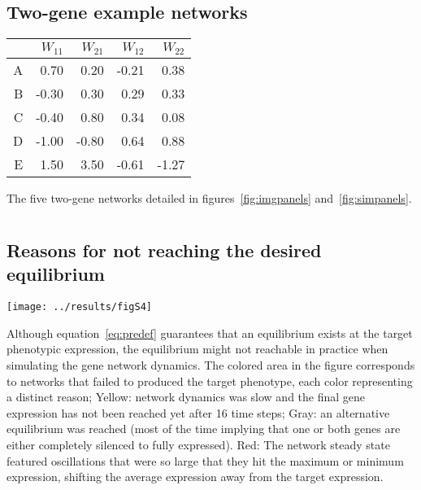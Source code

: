 \documentclass[10pt,a4paper]{article}
\begin{document}
\begin{appendices}
    \subsection*{Two-gene example networks}

	\begin{center}
	\begin{tabular}{rrrrr}
	  \hline
	 & $W_{11}$ & $W_{21}$ & $W_{12}$ & $W_{22}$ \\ 
	  \hline
	  A & 0.70 & 0.20 & -0.21 & 0.38 \\ 
	  B & -0.30 & 0.30 & 0.29 & 0.33 \\ 
	  C & -0.40 & 0.80 & 0.34 & 0.08 \\ 
	  D & -1.00 & -0.80 & 0.64 & 0.88 \\ 
	  E & 1.50 & 3.50 & -0.61 & -1.27 \\ 
	   \hline
	\end{tabular}
	\end{center}
	
	{\color{Gray} The five two-gene networks detailed in figures~\ref{fig:imgpanels} and~\ref{fig:simpanels}.}

  \clearpage
  \section{}
    \label{supp:whyitfails}
    \subsection*{Reasons for not reaching the desired equilibrium}
	\begin{center}
	\texttt{[image: ../results/figS4]}
	\end{center}
	
	{\color{Gray} Although equation~\ref{eq:predef} guarantees that an equilibrium exists at the target phenotypic expression, the equilibrium might not reachable in practice when simulating the gene network dynamics. The colored area in the figure corresponds to networks that failed to produced the target phenotype, each color representing a distinct reason; Yellow: network dynamics was slow and the final gene expression has not been reached yet after 16 time steps; Gray: an alternative equilibrium was reached (most of the time implying that one or both genes are either completely silenced to fully expressed). Red: The network steady state featured oscillations that were so large that they hit the maximum or minimum expression, shifting the average expression away from the target expression. }


\end{appendices}
\end{document}
